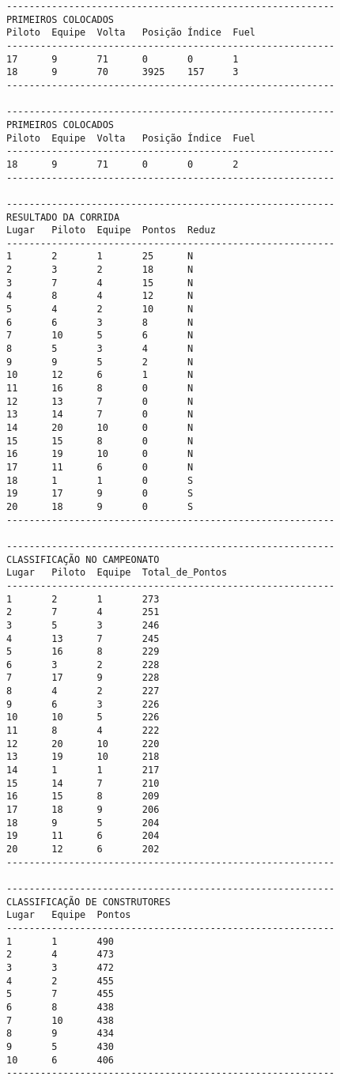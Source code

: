 \documentclass[12pt]{article}
\begin{document}
\begin{verbatim}
----------------------------------------------------------
PRIMEIROS COLOCADOS
Piloto  Equipe  Volta   Posição Índice  Fuel
----------------------------------------------------------
17      9       71      0       0       1
18      9       70      3925    157     3
----------------------------------------------------------

----------------------------------------------------------
PRIMEIROS COLOCADOS
Piloto  Equipe  Volta   Posição Índice  Fuel
----------------------------------------------------------
18      9       71      0       0       2
----------------------------------------------------------

----------------------------------------------------------
RESULTADO DA CORRIDA
Lugar   Piloto  Equipe  Pontos  Reduz
----------------------------------------------------------
1       2       1       25      N
2       3       2       18      N
3       7       4       15      N
4       8       4       12      N
5       4       2       10      N
6       6       3       8       N
7       10      5       6       N
8       5       3       4       N
9       9       5       2       N
10      12      6       1       N
11      16      8       0       N
12      13      7       0       N
13      14      7       0       N
14      20      10      0       N
15      15      8       0       N
16      19      10      0       N
17      11      6       0       N
18      1       1       0       S
19      17      9       0       S
20      18      9       0       S
----------------------------------------------------------

----------------------------------------------------------
CLASSIFICAÇÃO NO CAMPEONATO
Lugar   Piloto  Equipe  Total_de_Pontos
----------------------------------------------------------
1       2       1       273
2       7       4       251
3       5       3       246
4       13      7       245
5       16      8       229
6       3       2       228
7       17      9       228
8       4       2       227
9       6       3       226
10      10      5       226
11      8       4       222
12      20      10      220
13      19      10      218
14      1       1       217
15      14      7       210
16      15      8       209
17      18      9       206
18      9       5       204
19      11      6       204
20      12      6       202
----------------------------------------------------------

----------------------------------------------------------
CLASSIFICAÇÃO DE CONSTRUTORES
Lugar   Equipe  Pontos
----------------------------------------------------------
1       1       490
2       4       473
3       3       472
4       2       455
5       7       455
6       8       438
7       10      438
8       9       434
9       5       430
10      6       406
----------------------------------------------------------
\end{verbatim}
\end{document}
